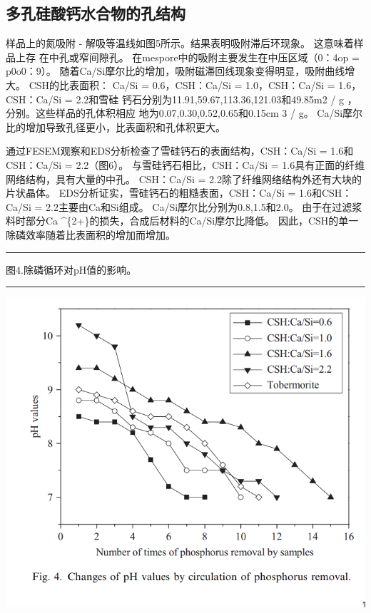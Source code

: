 \documentclass[11pt]{article}
\begin{document}
\subsection{多孔硅酸钙水合物的孔结构}
\label{sec:org6f134f6}
样品上的氮吸附 - 解吸等温线如图5所示。结果表明吸附滞后环现象。 这意味着样品上存
在中孔或窄间隙孔\cite{Poreestructure_and_surface_fractal_characteristics_of_calcium_silicate_hydrates_contained_organic_macromolecule}。 在mespore中的吸附主要发生在中压区域（0：4op = p0o0：9）。
随着Ca/Si摩尔比的增加，吸附磁滞回线现象变得明显，吸附曲线增大。 CSH的比表面积：
Ca/Si = 0.6，CSH：Ca/Si = 1.0，CSH：Ca/Si = 1.6，CSH：Ca/Si = 2.2和雪硅
钙石分别为11.91,59.67,113.36,121.03和49.85m2 / g ，分别。这些样品的孔体积相应
地为0.07,0.30,0.52,0.65和0.15cm 3 / g。 Ca/Si摩尔比的增加导致孔径更小，比表面积和孔体积更大。

通过FESEM观察和EDS分析检查了雪硅钙石的表面结构，CSH：Ca/Si = 1.6和CSH：Ca/Si = 2.2（图6）。 与雪硅钙石相比，CSH：Ca/Si = 1.6具有正面的纤维网络结构，具有大量的中孔。 CSH：Ca/Si = 2.2除了纤维网络结构外还有大块的片状晶体。 EDS分析证实，雪硅钙石的粗糙表面，CSH：Ca/Si = 1.6和CSH：Ca/Si = 2.2主要由Ca和Si组成。 Ca/Si摩尔比分别为0.8,1.5和2.0。 由于在过滤浆料时部分Ca \^{}\{2+\}的损失，合成后材料的Ca/Si摩尔比降低。 因此，CSH的单一除磷效率随着比表面积的增加而增加。

\noindent\rule{\textwidth}{0.5pt}

图4.除磷循环对pH值的影响。

\noindent\rule{\textwidth}{0.5pt}
\includegraphics[scale=0.5]{fig.4.png}
\end{document}
